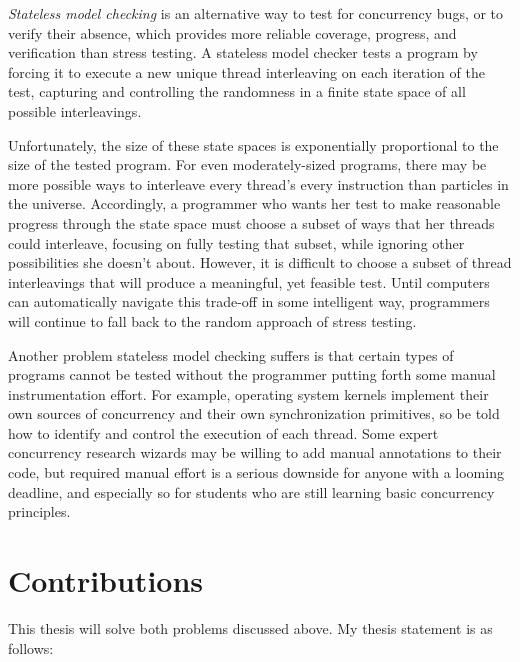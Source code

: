 {\em Stateless model checking} \cite{verisoft} is an alternative way to test for concurrency bugs,
or to verify their absence,
which provides more reliable coverage, progress, and verification than stress testing.
A stateless model checker tests a program by forcing it to execute a new unique thread interleaving on each iteration of the test,
capturing and controlling the randomness in a finite state space of all possible interleavings.

Unfortunately, the size of these state spaces is exponentially proportional to the size of the tested program.
For even moderately-sized programs, there may be more possible ways to interleave every thread's every instruction
than particles in the universe.
Accordingly, a programmer who wants her test to make reasonable progress through the state space must choose a subset of ways that her threads could interleave,
focusing on fully testing that subset, while ignoring other possibilities she doesn't  about.
However, it is difficult to choose a subset of thread interleavings that will produce a meaningful, yet feasible test.
Until computers can automatically navigate this trade-off in some intelligent way,
programmers will continue to fall back to the random approach of stress testing.

Another problem stateless model checking suffers is that certain types of programs cannot be tested without the programmer putting forth some manual instrumentation effort.
For example, operating system kernels implement their own sources of concurrency and their own synchronization primitives,
so  be told how to identify and control the execution of each thread.
Some expert concurrency research wizards may be willing to add manual annotations to their code,
but required manual effort is a serious downside for anyone with a looming deadline,
and especially so for students who are still learning basic concurrency principles.

\section{Contributions}

This thesis will solve both problems discussed above.
My thesis statement is as follows:

